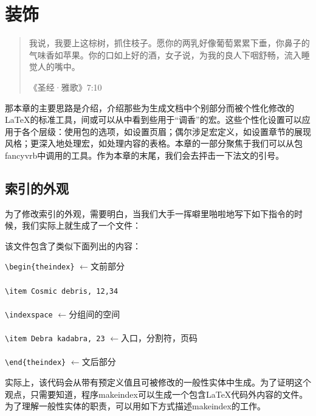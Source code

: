 \chapter{装饰}

\begin{quote}
    我说，我要上这棕树，抓住枝子。愿你的两乳好像葡萄累累下垂，你鼻子的气味香如苹果。你的口如上好的酒，女子说，为我的良人下咽舒畅，流入睡觉人的嘴中。

    \hfill《圣经·雅歌》7:10
\end{quote}

那本章的主要思路是介绍，介绍那些为生成文档中个别部分而被个性化修改的\LaTeX 的标准工具，间或可以从中看到些用于“调香”的宏。这些个性化设置可以应用于各个层级：使用包的选项，如设置页眉；偶尔涉足宏定义，如设置章节的展现风格；更深入地处理宏，如处理内容的表格。本章的一部分聚焦于我们可以从包\textsf{fancyvrb}中调用的工具。作为本章的末尾，我们会去抨击一下法文的引号。

\section{索引的外观} %

为了修改索引的外观，需要明白，当我们大手一挥噼里啪啦地写下如下指令的时候，我们实际上就生成了一个文件：


该文件包含了类似下面列出的内容：

\begin{dmd}
\verb|\begin{theindex}| \quad$\leftarrow$\textsf{文前部分}\\
~\\
\verb|\item Cosmic debris, 12,34|\\
~\\
\verb|\indexspace| \quad$\leftarrow$\textsf{分组间的空间}\\
~\\
\verb|\item Debra kadabra, 23| \quad$\leftarrow$\textsf{入口，分割符，页码}\\
~\\
\verb|\end{theindex}| \quad$\leftarrow$\textsf{文后部分}
\end{dmd}

实际上，该代码会从带有预定义值且可被修改的一般性实体中生成。为了证明这个观点，只需要知道，程序\textsf{makeindex}可以生成一个包含\LaTeX 代码外内容的文件。为了理解一般性实体的职责，可以用如下方式描述\textsf{makeindex}的工作。

